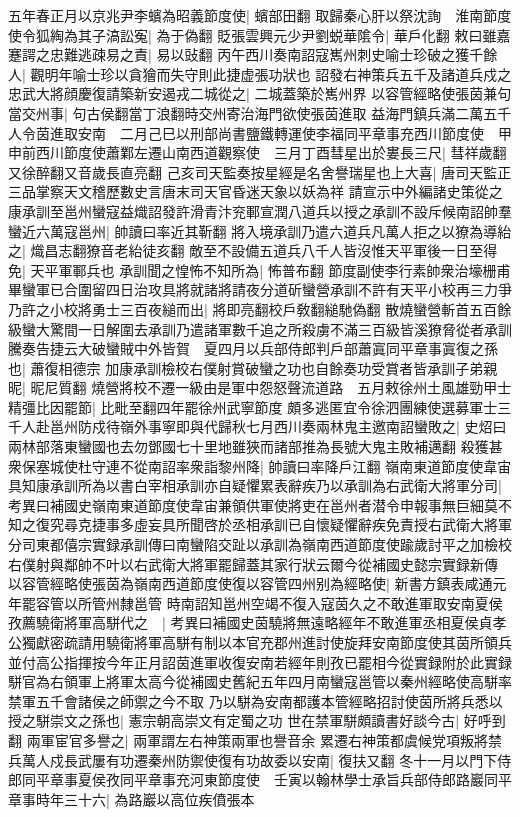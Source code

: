 五年春正月以京兆尹李蠙為昭義節度使|{
	蠙部田翻}
取歸秦心肝以祭沈詢　淮南節度使令狐綯為其子滈訟寃|{
	為于偽翻}
貶張雲興元少尹劉蜕華隂令|{
	華戶化翻}
敕曰雖嘉蹇諤之忠難逃疎易之責|{
	易以䜴翻}
丙午西川奏南詔寇嶲州刺史喻士珍破之獲千餘人|{
	觀明年喻士珍以貪獪而失守則此捷虚張功狀也}
詔發右神策兵五千及諸道兵戍之忠武大將顔慶復請築新安遏戎二城從之|{
	二城蓋築於嶲州界}
以容管經略使張茵兼句當交州事|{
	句古侯翻當丁浪翻時交州寄治海門欲使張茵進取}
益海門鎮兵滿二萬五千人令茵進取安南　二月己巳以刑部尚書鹽鐵轉運使李福同平章事充西川節度使　甲申前西川節度使蕭鄴左遷山南西道觀察使　三月丁酉彗星出於婁長三尺|{
	彗祥歲翻又徐醉翻又音歲長直亮翻}
己亥司天監奏按星經是名舍譽瑞星也上大喜|{
	唐司天監正三品掌察天文稽歷數史言唐末司天官昏迷天象以妖為祥}
請宣示中外編諸史策從之　康承訓至邕州蠻寇益熾詔發許滑青汴兖鄆宣潤八道兵以授之承訓不設斥候南詔帥羣蠻近六萬寇邕州|{
	帥讀曰率近其靳翻}
將入境承訓乃遣六道兵凡萬人拒之以獠為導紿之|{
	熾昌志翻獠音老紿徒亥翻}
敵至不設備五道兵八千人皆沒惟天平軍後一日至得免|{
	天平軍鄆兵也}
承訓聞之惶怖不知所為|{
	怖普布翻}
節度副使李行素帥衆治壕栅甫畢蠻軍已合圍留四日治攻具將就諸將請夜分道斫蠻營承訓不許有天平小校再三力爭乃許之小校將勇士三百夜縋而出|{
	將即亮翻校戶敎翻縋馳偽翻}
散燒蠻營斬首五百餘級蠻大驚間一日解圍去承訓乃遣諸軍數千追之所殺虜不滿三百級皆溪獠脅從者承訓騰奏告捷云大破蠻賊中外皆賀　夏四月以兵部侍郎判戶部蕭寘同平章事寘復之孫也|{
	蕭復相德宗}
加康承訓檢校右僕射賞破蠻之功也自餘奏功受賞者皆承訓子弟親昵|{
	昵尼質翻}
燒營將校不遷一級由是軍中怨怒聲流道路　五月敕徐州土風雄勁甲士精彊比因罷節|{
	比毗至翻四年罷徐州武寧節度}
頗多逃匿宜令徐泗團練使選募軍士三千人赴邕州防戍待嶺外事寧即與代歸秋七月西川奏兩林鬼主邀南詔蠻敗之|{
	史炤曰兩林部落東蠻國也去勿鄧國七十里地雖狹而諸部推為長號大鬼主敗補邁翻}
殺獲甚衆保塞城使杜守連不從南詔率衆詣黎州降|{
	帥讀曰率降戶江翻}
嶺南東道節度使韋宙具知康承訓所為以書白宰相承訓亦自疑懼累表辭疾乃以承訓為右武衛大將軍分司|{
	考異曰補國史嶺南東道節度使韋宙兼領供軍使將吏在邕州者潜令申報事無巨細莫不知之復究尋克捷事多虛妄具所聞啓於丞相承訓已自懷疑懼辭疾免責授右武衛大將軍分司東都僖宗實録承訓傳曰南蠻陷交趾以承訓為嶺南西道節度使踰歲討平之加檢校右僕射與鄰帥不叶以右武衛大將軍罷歸蓋其家行狀云爾今從補國史懿宗實録新傳}
以容管經略使張茵為嶺南西道節度使復以容管四州别為經略使|{
	新書方鎮表咸通元年罷容管以所管州隸邕管}
時南詔知邕州空竭不復入寇茵久之不敢進軍取安南夏侯孜薦驍衛將軍高駢代之　|{
	考異曰補國史茵驍將無遠略經年不敢進軍丞相夏侯貞孝公獨獻密疏請用驍衛將軍高駢有制以本官充郡州進討使旋拜安南節度使其茵所領兵並付高公指揮按今年正月詔茵進軍收復安南若經年則孜已罷相今從實録附於此實録駢官為右領軍上將軍太高今從補國史舊紀五年四月南蠻寇邕管以秦州經略使高駢率禁軍五千會諸侯之師禦之今不取}
乃以駢為安南都護本管經略招討使茵所將兵悉以授之駢崇文之孫也|{
	憲宗朝高崇文有定蜀之功}
世在禁軍駢頗讀書好談今古|{
	好呼到翻}
兩軍宦官多譽之|{
	兩軍謂左右神策兩軍也譽音余}
累遷右神策都虞候党項叛將禁兵萬人戍長武屢有功遷秦州防禦使復有功故委以安南|{
	復扶又翻}
冬十一月以門下侍郎同平章事夏侯孜同平章事充河東節度使　壬寅以翰林學士承旨兵部侍郎路巖同平章事時年三十六|{
	為路巖以高位疾僨張本}


